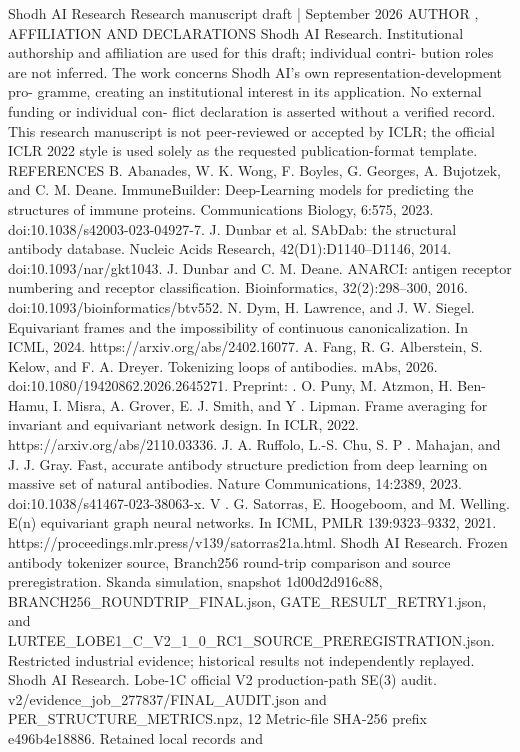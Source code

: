 \documentclass[11pt]{article}
\begin{document}
Shodh AI Research Research manuscript draft | September 2026
AUTHOR , AFFILIATION AND DECLARATIONS
Shodh AI Research. Institutional authorship and affiliation are used for this draft; individual contri-
bution roles are not inferred. The work concerns Shodh AI’s own representation-development pro-
gramme, creating an institutional interest in its application. No external funding or individual con-
flict declaration is asserted without a verified record. This research manuscript is not peer-reviewed
or accepted by ICLR; the official ICLR 2022 style is used solely as the requested publication-format
template.
REFERENCES
B. Abanades, W. K. Wong, F. Boyles, G. Georges, A. Bujotzek, and C. M. Deane. ImmuneBuilder:
Deep-Learning models for predicting the structures of immune proteins. Communications Biology, 6:575,
2023. doi:10.1038/s42003-023-04927-7.
J. Dunbar et al. SAbDab: the structural antibody database. Nucleic Acids Research, 42(D1):D1140–D1146,
2014. doi:10.1093/nar/gkt1043.
J. Dunbar and C. M. Deane. ANARCI: antigen receptor numbering and receptor classification. Bioinformatics,
32(2):298–300, 2016. doi:10.1093/bioinformatics/btv552.
N. Dym, H. Lawrence, and J. W. Siegel. Equivariant frames and the impossibility of continuous
canonicalization. In ICML, 2024. https://arxiv.org/abs/2402.16077.
A. Fang, R. G. Alberstein, S. Kelow, and F. A. Dreyer. Tokenizing loops of antibodies. mAbs, 2026.
doi:10.1080/19420862.2026.2645271. Preprint: .
O. Puny, M. Atzmon, H. Ben-Hamu, I. Misra, A. Grover, E. J. Smith, and Y . Lipman. Frame averaging for
invariant and equivariant network design. In ICLR, 2022. https://arxiv.org/abs/2110.03336.
J. A. Ruffolo, L.-S. Chu, S. P . Mahajan, and J. J. Gray. Fast, accurate antibody structure prediction from deep
learning on massive set of natural antibodies. Nature Communications, 14:2389, 2023.
doi:10.1038/s41467-023-38063-x.
V . G. Satorras, E. Hoogeboom, and M. Welling. E(n) equivariant graph neural networks. In ICML, PMLR
139:9323–9332, 2021. https://proceedings.mlr.press/v139/satorras21a.html.
Shodh AI Research. Frozen antibody tokenizer source, Branch256 round-trip comparison and source
preregistration. Skanda simulation, snapshot 1d00d2d916c88,
BRANCH256\_ROUNDTRIP\_FINAL.json, GATE\_RESULT\_RETRY1.json, and
LURTEE\_LOBE1\_C\_V2\_1\_0\_RC1\_SOURCE\_PREREGISTRATION.json. Restricted industrial
evidence; historical results not independently replayed.
Shodh AI Research. Lobe-1C official V2 production-path SE(3) audit.
v2/evidence\_job\_277837/FINAL\_AUDIT.json and PER\_STRUCTURE\_METRICS.npz, 12
Metric-file SHA-256 prefix e496b4e18886. Retained local records and
\end{document}
